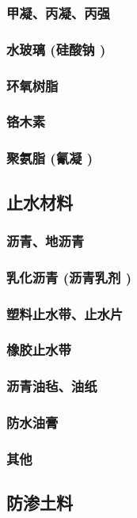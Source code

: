 \documentclass[UTF8]{../../ApplicationUniverse}
\begin{document}
        \subsubsection{甲凝、丙凝、丙强}
        \subsubsection{水玻璃 (硅酸钠 )}
        \subsubsection{环氧树脂}
        \subsubsection{铬木素}
        \subsubsection{聚氨脂 (氰凝 )}
    \subsection{止水材料}
        \subsubsection{沥青、地沥青}
        \subsubsection{乳化沥青 (沥青乳剂 )}
        \subsubsection{塑料止水带、止水片}
        \subsubsection{橡胶止水带}
        \subsubsection{沥青油毡、油纸}
        \subsubsection{防水油膏}
        \subsubsection{其他}
    \subsection{防渗土料}
\end{document}
